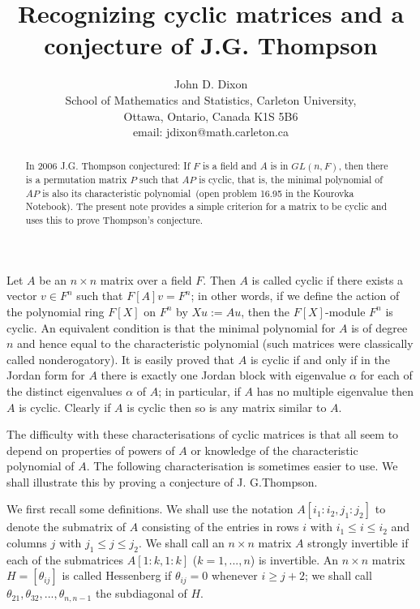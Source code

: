 \documentclass{article}%
\begin{document}
\title{Recognizing cyclic matrices and a conjecture of J.G. Thompson}
\author{John D. Dixon\\School of Mathematics and Statistics, Carleton University, \\Ottawa, Ontario, Canada K1S 5B6\\email: jdixon@math.carleton.ca}
\maketitle

\begin{abstract}
In 2006 J.G. Thompson conjectured: If $F$ is a field and $A$ is in $GL(n,F)$,
then there is a permutation matrix $P$ such that $AP$ is cyclic, that is, the
minimal polynomial of $AP$ is also its characteristic polynomial\ (open
problem 16.95 in the Kourovka Notebook). The present note provides a simple
criterion for a matrix to be cyclic and uses this to prove Thompson's conjecture.

\end{abstract}



Let $A$ be an $n\times n$ matrix over a field $F$. Then $A$ is called cyclic
if there exists a vector $v\in F^{n}$ such that $F[A]v=F^{n}$; in other words,
if we define the action of the polynomial ring $F[X]$ on $F^{n}$ by $Xu:=Au$,
then the $F[X]$-module $F^{n}$ is cyclic. An equivalent condition is that the
minimal polynomial for $A$ is of degree $n$ and hence equal to the
characteristic polynomial (such matrices were classically called
nonderogatory). It is easily proved that $A$ is cyclic if and only if in the
Jordan form for $A$ there is exactly one Jordan block with eigenvalue $\alpha$
for each of the distinct eigenvalues $\alpha$ of $A$; in particular, if $A$
has no multiple eigenvalue then $A$ is cyclic. Clearly if $A$ is cyclic then
so is any matrix similar to $A$.

The difficulty with these characterisations of cyclic matrices is that all
seem to depend on properties of powers of $A$ or knowledge of the
characteristic polynomial of $A$. The following characterisation is sometimes
easier to use. We shall illustrate this by proving a conjecture of J. G.Thompson.

We first recall some definitions. We shall use the notation $A[i_{1}%
:i_{2},j_{1}:j_{2}]$ to denote the submatrix of $A$ consisting of the entries
in rows $i$ with $i_{1}\leq i\leq i_{2}$ and columns $j$ with $j_{1}\leq j\leq
j_{2}$. We shall call an $n\times n$ matrix $A$ strongly invertible if each of
the submatrices $A[1:k,1:k]$ ($k=1,...,n$) is invertible. An $n\times n$
matrix $H=[\theta_{ij}]$ is called Hessenberg if $\theta_{ij}=0$ whenever
$i\geq j+2$; we shall call $\theta_{21},\theta_{32},...,\theta_{n,n-1}$ the
subdiagonal of $H$.
\end{document}
